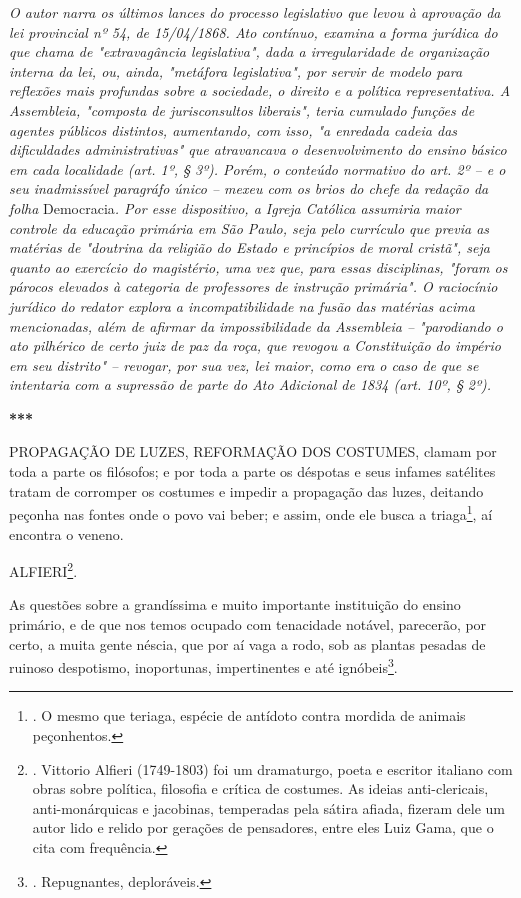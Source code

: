\emph{O autor narra os últimos lances do processo legislativo que levou
à aprovação da lei provincial nº 54, de 15/04/1868. Ato contínuo,
examina a forma jurídica do que chama de "extravagância legislativa",
dada a irregularidade de organização interna da lei, ou, ainda,
"metáfora legislativa", por servir de modelo para reflexões mais
profundas sobre a sociedade, o direito e a política representativa. A
Assembleia, "composta de jurisconsultos liberais", teria cumulado
funções de agentes públicos distintos, aumentando, com isso, "a enredada
cadeia das dificuldades administrativas" que atravancava o
desenvolvimento do ensino básico em cada localidade (art. 1º, § 3º).
Porém, o conteúdo normativo do art. 2º -- e o seu inadmissível paragráfo
único -- mexeu com os brios do chefe da redação da folha}
Democracia\emph{. Por esse dispositivo, a Igreja Católica assumiria
maior controle da educação primária em São Paulo, seja pelo currículo
que previa as matérias de "doutrina da religião do Estado e princípios
de moral cristã", seja quanto ao exercício do magistério, uma vez que,
para essas disciplinas, "foram os párocos elevados à categoria de
professores de instrução primária". O raciocínio jurídico do redator
explora a incompatibilidade na fusão das matérias acima mencionadas,
além de afirmar da impossibilidade da Assembleia -- "parodiando o ato
pilhérico de certo juiz de paz da roça, que revogou a Constituição do
império em seu distrito" -- revogar, por sua vez, lei maior, como era o
caso de que se intentaria com a supressão de parte do Ato Adicional de
1834 (art. 10º, § 2º).}

\textbf{***}

PROPAGAÇÃO DE LUZES, REFORMAÇÃO DOS COSTUMES, clamam por toda a parte os
filósofos; e por toda a parte os déspotas e seus infames satélites
tratam de corromper os costumes e impedir a propagação das luzes,
deitando peçonha nas fontes onde o povo vai beber; e assim, onde ele
busca a triaga\footnote{. O mesmo que teriaga, espécie de antídoto
  contra mordida de animais peçonhentos.}, aí encontra o veneno.

ALFIERI\footnote{. Vittorio Alfieri (1749-1803) foi um dramaturgo, poeta
  e escritor italiano com obras sobre política, filosofia e crítica de
  costumes. As ideias anti-clericais, anti-monárquicas e jacobinas,
  temperadas pela sátira afiada, fizeram dele um autor lido e relido por
  gerações de pensadores, entre eles Luiz Gama, que o cita com
  frequência.}.

As questões sobre a grandíssima e muito importante instituição do ensino
primário, e de que nos temos ocupado com tenacidade notável, parecerão,
por certo, a muita gente néscia, que por aí vaga a rodo, sob as plantas
pesadas de ruinoso despotismo, inoportunas, impertinentes e até
ignóbeis\footnote{. Repugnantes, deploráveis.}.

